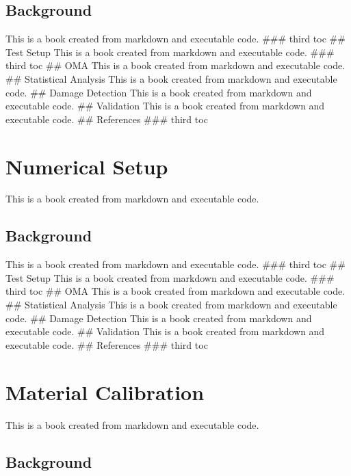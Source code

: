 \documentclass[
  letterpaper,
  DIV=11,
  numbers=noendperiod]{scrreprt}
\begin{document}
\hypertarget{background-8}{%
\section{Background}\label{background-8}}

This is a book created from markdown and executable code. \#\#\# third
toc \#\# Test Setup This is a book created from markdown and executable
code. \#\#\# third toc \#\# OMA This is a book created from markdown and
executable code. \#\# Statistical Analysis This is a book created from
markdown and executable code. \#\# Damage Detection This is a book
created from markdown and executable code. \#\# Validation This is a
book created from markdown and executable code. \#\# References \#\#\#
third toc

\hypertarget{numerical-setup}{%
\chapter{Numerical Setup}\label{numerical-setup}}

This is a book created from markdown and executable code.

\hypertarget{background-9}{%
\section{Background}\label{background-9}}

This is a book created from markdown and executable code. \#\#\# third
toc \#\# Test Setup This is a book created from markdown and executable
code. \#\#\# third toc \#\# OMA This is a book created from markdown and
executable code. \#\# Statistical Analysis This is a book created from
markdown and executable code. \#\# Damage Detection This is a book
created from markdown and executable code. \#\# Validation This is a
book created from markdown and executable code. \#\# References \#\#\#
third toc

\hypertarget{material-calibration}{%
\chapter{Material Calibration}\label{material-calibration}}

This is a book created from markdown and executable code.

\hypertarget{background-10}{%
\section{Background}\label{background-10}}
\end{document}
